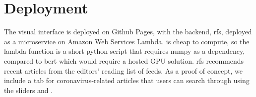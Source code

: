 \section{Deployment}
The visual interface is deployed on Github Pages, with the backend, \gls{rfs}, deployed as a microservice on Amazon Web Services Lambda.  is cheap to compute, so the lambda function is a short python script that requires numpy as a dependency, compared to \acrshort{bert} which would require a hosted GPU solution. \gls{rfs} recommends recent articles from the editors' reading list of feeds. As a proof of concept, we include a tab for coronavirus-related articles that users can search through using the sliders and .